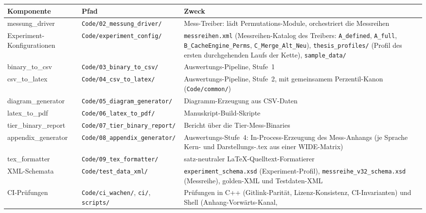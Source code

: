{\small
\begin{longtable}{@{}>{\raggedright\arraybackslash}p{}>{\raggedright\arraybackslash}p{}>{\raggedright\arraybackslash}p{}@{}}
\toprule
\textbf{Komponente} & \textbf{Pfad} & \textbf{Zweck} \\
\midrule
\endhead%
\midrule
\endfoot%
\bottomrule
\endlastfoot%
messung\_driver &
\texttt{Code/\allowbreak{}02\_messung\_driver/} &
Mess-Treiber: lädt Permutations-Module, orchestriert die Messreihen \\
Experiment-Konfigurationen &
\texttt{Code/\allowbreak{}experiment\_config/} &
\texttt{messreihen.xml} (Messreihen-Katalog des Treibers: \texttt{A\_defined}, \texttt{A\_full},
\texttt{B\_\allowbreak{}CacheEngine\_\allowbreak{}Perms}, \texttt{C\_\allowbreak{}Merge\_\allowbreak{}Alt\_\allowbreak{}Neu}),
\texttt{thesis\_\allowbreak{}profiles/} (Profil des ersten durchgehenden Laufs der Kette), \texttt{sample\_\allowbreak{}data/} \\
binary\_to\_csv &
\texttt{Code/\allowbreak{}03\_binary\_to\_csv/} &
Auswertungs-Pipeline, Stufe~1 \\
csv\_to\_latex &
\texttt{Code/\allowbreak{}04\_csv\_to\_latex/} &
Auswertungs-Pipeline, Stufe~2, mit gemeinsamem Perzentil-Kanon (\texttt{Code/\allowbreak{}common/}) \\
diagram\_generator &
\texttt{Code/\allowbreak{}05\_diagram\_generator/} &
Diagramm-Erzeugung aus CSV-Daten \\
latex\_to\_pdf &
\texttt{Code/\allowbreak{}06\_latex\_to\_pdf/} &
Manuskript-Build-Skripte \\
tier\_binary\_report &
\texttt{Code/\allowbreak{}07\_tier\_binary\_report/} &
Bericht über die Tier-Mess-Binaries \\
appendix\_generator &
\texttt{Code/\allowbreak{}08\_appendix\_generator/} &
Auswertungs-Stufe~4: In-Process-Erzeugung des Mess-Anhangs (je Sprache Kern- und Darstellungs-.tex aus
einer WIDE-Matrix) \\
tex\_formatter &
\texttt{Code/\allowbreak{}09\_tex\_formatter/} &
satz-neutraler LaTeX-Quelltext-Formatierer \\
XML-Schemata &
\texttt{Code/\allowbreak{}test\_data\_xml/} &
\texttt{experiment\_\allowbreak{}schema.xsd} (Experiment-Profil), \texttt{messreihe\_\allowbreak{}v32\_\allowbreak{}schema.xsd}
(Messreihe), golden-XML und Testdaten-XML \\
CI-Prüfungen &
\texttt{Code/\allowbreak{}ci\_wachen/}, \texttt{ci/}, \texttt{scripts/} &
Prüfungen in C++ (Gitlink-Parität, Lizenz-Konsistenz, CI-Invarianten) und Shell (Anhang-Vorwärts-Kanal,

\end{longtable}}
